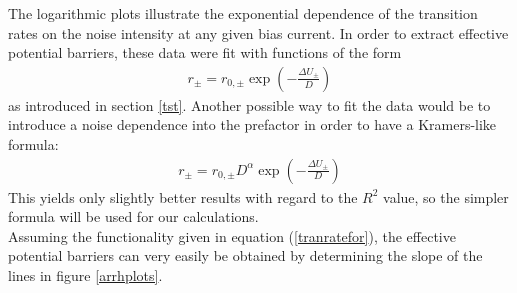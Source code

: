 \documentclass[12pt,a4paper]{article}
\begin{document}
The logarithmic plots illustrate the exponential dependence of the transition rates on the noise intensity at any given bias current. In order to extract effective potential barriers, these data were fit with functions of the form
\begin{align}\label{tranratefor}
r_{\pm}=r_{0,\pm}\exp\left(-\frac{\Delta U_{\pm}}{D}\right)
\end{align}
as introduced in section \ref{tst}. Another possible way to fit the data would be to introduce a noise dependence into the prefactor in order to have a Kramers-like formula:
\begin{align*}
r_{\pm}=r_{0,\pm}D^\alpha\exp\left(-\frac{\Delta U_{\pm}}{D}\right)
\end{align*}
This yields only slightly better results with regard to the $R^2$ value, so the simpler formula will be used for our calculations.\\
Assuming the functionality given in equation (\ref{tranratefor}), the effective potential barriers can very easily be obtained by determining the slope of the lines in figure \ref{arrhplots}.
\end{document}
